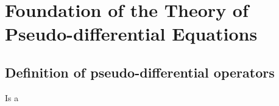 \chapter{Foundation of the Theory of Pseudo-differential Equations}

\section{Definition of pseudo-differential operators}

Is a

